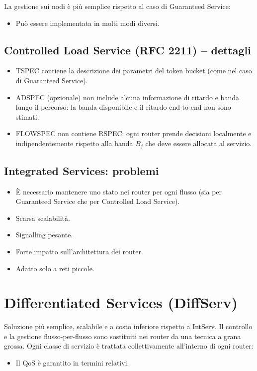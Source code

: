 La gestione sui nodi è più semplice rispetto al caso di Guaranteed Service:
\begin{itemize}
	\item Può essere implementata in molti modi diversi.
\end{itemize}

\subsection{Controlled Load Service (RFC 2211) – dettagli}
\begin{itemize}
	\item TSPEC contiene la descrizione dei parametri del token bucket (come nel caso di Guaranteed Service).
	\item ADSPEC (opzionale) non include alcuna informazione di ritardo e banda lungo il percorso: la banda disponibile e il ritardo end-to-end non sono stimati.
	\item FLOWSPEC non contiene RSPEC: ogni router prende decisioni localmente e indipendentemente rispetto alla banda $B_j$ che deve essere allocata al servizio.
\end{itemize}

\subsection{Integrated Services: problemi}
\begin{itemize}
	\item È necessario mantenere uno stato nei router per ogni flusso (sia per Guaranteed Service che per Controlled Load Service).
	\item Scarsa scalabilità.
	\item Signalling pesante.
	\item Forte impatto sull'architettura dei router.
	\item Adatto solo a reti piccole.
\end{itemize}
\section{Differentiated Services (DiffServ)}
Soluzione più semplice, scalabile e a costo inferiore rispetto a IntServ. Il controllo e la gestione flusso-per-flusso sono sostituiti nei router da una tecnica a grana grossa. Ogni classe di servizio è trattata collettivamente all'interno di ogni router:
\begin{itemize}
	\item Il QoS è garantito in termini relativi.
\end{itemize}


